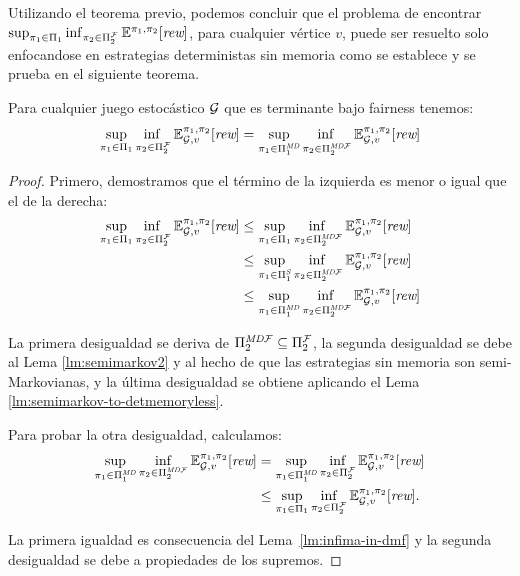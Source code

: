 Utilizando el teorema previo, podemos concluir que el problema de encontrar $\sup_{\pi_{1} \in \Pi_{1}} \inf_{\pi_{2} \in \Pi^{\mathcal{F}}_{2}} \mathbb{E}^{\pi_{1}, \pi_{2}}[\textit{rew}]$, para cualquier vértice $v$, puede ser resuelto solo enfocandose en estrategias deterministas sin memoria como se establece y se prueba en el siguiente teorema.
%
\begin{theorem}\label{thm:reduce-to-memoryless}
  Para cualquier juego estocástico $\mathcal{G}$  que es terminante bajo fairness tenemos:
  \[
  \adjustlimits \sup_{\strat{1} \in \Strategies{1}} \inf_{\strat{2} \in \FairStrats{2}} \Expect{\strat{1}}{\strat{2}}_{\StochG,v}[\Rewards]
  =
  \adjustlimits \sup_{\strat{1} \in \DetMemorylessStrats{1}} \inf_{\strat{2} \in \DetMemorylessFairStrats{2}} \Expect{\strat{1}}{\strat{2}}_{\StochG,v}[\Rewards]
 \]
\end{theorem}
%
\begin{proof}
	Primero, demostramos que el término de la izquierda es menor o igual que el de la derecha:
\begin{align*}
  \adjustlimits \sup_{\strat{1} \in \Strategies{1}} \inf_{\strat{2} \in \FairStrats{2}} \Expect{\strat{1}}{\strat{2}}_{\StochG,v}[\Rewards]
  &{} \leq  \adjustlimits \sup_{\strat{1} \in \Strategies{1}} \inf_{\strat{2} \in \DetMemorylessFairStrats{2}} \Expect{\strat{1}}{\strat{2}}_{\StochG,v}[\Rewards]\\
  &{} \leq \adjustlimits  \sup_{\strat{1} \in \SemiMarkovStrats{1}} \inf_{\strat{2} \in \DetMemorylessFairStrats{2}} \Expect{\strat{1}}{\strat{2}}_{\StochG,v}[\Rewards]\\
  &{} \leq \adjustlimits \sup_{\strat{1} \in \DetMemorylessStrats{1}} \inf_{\strat{2} \in \DetMemorylessFairStrats{2}} \Expect{\strat{1}}{\strat{2}}_{\StochG,v}[\Rewards]
\end{align*}

La primera desigualdad se deriva de $\Pi^{\textit{MD}\mathcal{F}}_{2} \subseteq \Pi^{\mathcal{F}}_{2}$, la segunda desigualdad se debe al Lema \ref{lm:semimarkov2} y al hecho de que las estrategias sin memoria son semi-Markovianas, y la última desigualdad se obtiene aplicando el Lema \ref{lm:semimarkov-to-detmemoryless}.

Para probar la otra desigualdad, calculamos:
%
 \begin{align*}
  \sup_{\pi_{1} \in \Pi^{\textit{MD}}_{1}} \inf_{\pi_{2} \in \Pi^{\textit{MD}\mathcal{F}}_{2}} \mathbb{E}^{\pi_{1}, \pi_{2}}_{\mathcal{G},v}[\textit{rew}]
 & {} = \sup_{\pi_{1} \in \Pi^{\textit{MD}}_{1}} \inf_{\pi_{2} \in \Pi^{\mathcal{F}}_{2}} \mathbb{E}^{\pi_{1}, \pi_{2}}_{\mathcal{G},v}[\textit{rew}] \\
 & {} \leq \sup_{\pi_{1} \in \Pi_{1}} \inf_{\pi_{2} \in \Pi^{\mathcal{F}}_{2}} \mathbb{E}^{\pi_{1}, \pi_{2}}_{\mathcal{G},v}[\textit{rew}].
 \end{align*}

%
  La primera igualdad es consecuencia del Lema~\ref{lm:infima-in-dmf} y la segunda desigualdad se debe a propiedades de los supremos.
\qedhere
\end{proof}





